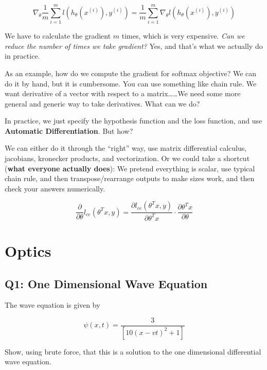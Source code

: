\documentclass[
  letterpaper,
  DIV=11,
  numbers=noendperiod]{scrreprt}
\begin{document}
\[\nabla_\theta \frac{1}{m} \sum_{i=1}^{m} l(h_\theta(x^{(i)}), y^{(i)}) =  \frac{1}{m} \sum_{i=1}^{m} \nabla_\theta l(h_\theta(x^{(i)}), y^{(i)})\]

We have to calculate the gradient \(m\) times, which is very expensive.
\emph{Can we reduce the number of times we take gradient?} Yes, and
that's what we actually do in practice.

As an example, how do we compute the gradient for softmax objective? We
can do it by hand, but it is cumbersome. You can use something like
chain rule. We want derivative of a vector with respect to a
matrix\ldots\ldots We need some more general and generic way to take
derivatives. What can we do?

In practice, we just specify the hypothesis function and the loss
function, and use \textbf{Automatic Differentiation}. But how?

We can either do it through the ``right'' way, use matrix differential
calculus, jacobians, kronecker products, and vectorization. Or we could
take a shortcut (\textbf{what everyone actually does}): We pretend
everything is scalar, use typical chain rule, and then
transpose/rearrange outputs to make sizes work, and then check your
answers numerically.

\[\frac{\partial}{\partial \theta} l_{ce} (\theta^T x, y)= \frac{\partial l_{ce} (\theta^T x, y)}{\partial \theta^T x} \cdot \frac{\partial \theta^T x}{\partial \theta}\]


\chapter*{Optics}\label{optics}


\section*{Q1: One Dimensional Wave
Equation}\label{q1-one-dimensional-wave-equation}


The wave equation is given by

\[\psi(x,t) = \frac{3}{[10(x - vt)^2 + 1]}\]

Show, using brute force, that this is a solution to the one dimensional
differential wave equation.
\end{document}
